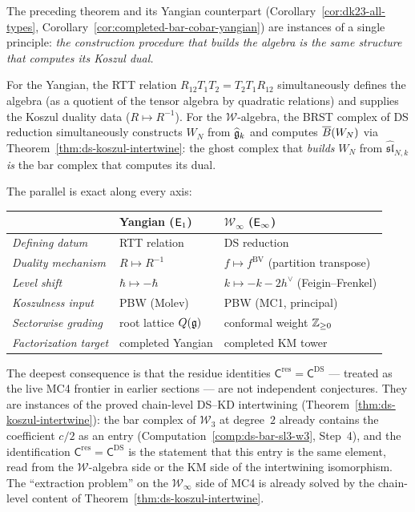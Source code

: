 \begin{remark}
\label{rem:ds-is-the-duality-datum}
The preceding theorem and its Yangian counterpart
(Corollary~\ref{cor:dk23-all-types},
Corollary~\ref{cor:completed-bar-cobar-yangian}) are
instances of a single principle:
\emph{the construction procedure that builds the algebra is the
same structure that computes its Koszul dual.}

For the Yangian, the RTT relation $R_{12}T_1T_2 = T_2T_1R_{12}$
simultaneously defines the algebra (as a quotient of the tensor
algebra by quadratic relations) and supplies the Koszul duality
data ($R \mapsto R^{-1}$).  For the $\mathcal{W}$-algebra, the
BRST complex of DS reduction simultaneously constructs $W_N$ from
$\widehat{\fg}_k$ and computes $\barB(W_N)$ via
Theorem~\ref{thm:ds-koszul-intertwine}: the ghost complex that
\emph{builds} $W_N$ from $\widehat{\mathfrak{sl}}_{N,k}$
\emph{is} the bar complex that computes its dual.

The parallel is exact along every axis:
\begin{center}
\renewcommand{\arraystretch}{1.2}
\begin{tabular}{lll}
& \textbf{Yangian} ($\Eone$) &
\textbf{$\mathcal{W}_\infty$} ($\Einf$) \\
\hline
\emph{Defining datum} &
  RTT relation &
  DS reduction \\
\emph{Duality mechanism} &
  $R \mapsto R^{-1}$ &
  $f \mapsto f^{\mathrm{BV}}$
  (partition transpose) \\
\emph{Level shift} &
  $\hbar \mapsto -\hbar$ &
  $k \mapsto -k - 2h^\vee$
  (Feigin--Frenkel) \\
\emph{Koszulness input} &
  PBW (Molev) &
  PBW (MC1, principal) \\
\emph{Sectorwise grading} &
  root lattice $Q(\fg)$ &
  conformal weight $\bZ_{\ge 0}$ \\
\emph{Factorization target} &
  completed Yangian &
  completed KM tower \\
\end{tabular}
\end{center}

\smallskip\noindent
The deepest consequence is that the residue identities
$\mathsf{C}^{\mathrm{res}} = \mathsf{C}^{\mathrm{DS}}$
--- treated as the live MC4 frontier in earlier sections ---
are not independent conjectures.  They are instances of the proved
chain-level DS--KD intertwining
(Theorem~\ref{thm:ds-koszul-intertwine}):
the bar complex of $\mathcal{W}_3$ at degree~$2$ already
contains the coefficient $c/2$ as an entry
(Computation~\ref{comp:ds-bar-sl3-w3}, Step~4), and the
identification $\mathsf{C}^{\mathrm{res}} =
\mathsf{C}^{\mathrm{DS}}$ is the statement that this entry
is the same element, read from the $\mathcal{W}$-algebra side or
the KM side of the intertwining isomorphism.
The ``extraction problem'' on the $\mathcal{W}_\infty$ side of
MC4 is already solved by the chain-level content of
Theorem~\ref{thm:ds-koszul-intertwine}.
\end{remark}

